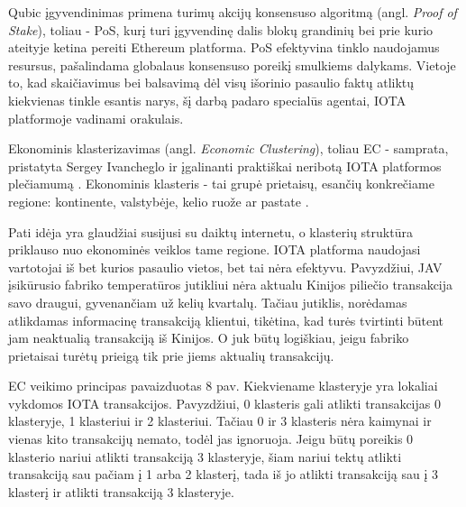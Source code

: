 Qubic įgyvendinimas primena turimų akcijų konsensuso algoritmą (angl. \textit{Proof of Stake}), toliau - PoS, kurį turi įgyvendinę dalis blokų grandinių bei prie kurio ateityje ketina pereiti Ethereum platforma. PoS efektyvina tinklo naudojamus resursus, pašalindama globalaus konsensuso poreikį smulkiems dalykams. Vietoje to, kad skaičiavimus bei balsavimą dėl visų išorinio pasaulio faktų atliktų kiekvienas tinkle esantis narys, šį darbą padaro specialūs agentai, IOTA platformoje vadinami orakulais.





Ekonominis klasterizavimas (angl. \textit{Economic Clustering}), toliau EC - samprata, pristatyta Sergey Ivancheglo ir įgalinanti praktiškai neribotą IOTA platformos plečiamumą \cite{sergey2018economic}.
Ekonominis klasteris - tai grupė prietaisų, esančių konkrečiame regione: kontinente, valstybėje, kelio ruože ar pastate \cite{sergey2018economic}. 

Pati idėja yra glaudžiai susijusi su daiktų internetu, o klasterių struktūra priklauso nuo ekonominės veiklos tame regione. IOTA platforma naudojasi vartotojai iš bet kurios pasaulio vietos, bet tai nėra efektyvu. Pavyzdžiui, JAV įsikūrusio fabriko temperatūros jutikliui nėra aktualu Kinijos piliečio transakcija savo draugui, gyvenančiam už kelių kvartalų. Tačiau jutiklis, norėdamas atlikdamas informacinę transakciją klientui, tikėtina, kad turės tvirtinti būtent jam neaktualią transakciją iš Kinijos. O juk būtų logiškiau, jeigu fabriko prietaisai turėtų prieigą tik prie jiems aktualių transakcijų.

EC veikimo principas pavaizduotas 8 pav. Kiekviename klasteryje yra lokaliai vykdomos IOTA transakcijos. Pavyzdžiui, 0 klasteris gali atlikti transakcijas 0 klasteryje, 1 klasteriui ir 2 klasteriui. Tačiau 0 ir 3 klasteris nėra kaimynai ir vienas kito transakcijų nemato, todėl jas ignoruoja. Jeigu būtų poreikis 0 klasterio nariui atlikti transakciją 3 klasteryje, šiam nariui tektų atlikti transakciją sau pačiam į 1 arba 2 klasterį, tada iš jo atlikti transakciją sau į 3 klasterį ir atlikti transakciją 3 klasteryje.

